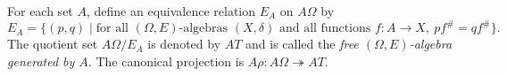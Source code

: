 For each set $A$, define an equivalence relation $E_A$ on $A\Omega$ by
$$
E_A = \{(p, q) \mid \text{for all } (\Omega, E)\text{-algebras } (X, \delta) \text{ and all functions } f: A \to X,\ pf^{\#} = qf^{\#}\}.
$$
The quotient set $A\Omega/E_A$ is denoted by $AT$ and is called the \textit{free $(\Omega, E)$-algebra generated by $A$}. The canonical projection is $A\rho: A\Omega \twoheadrightarrow AT$.
